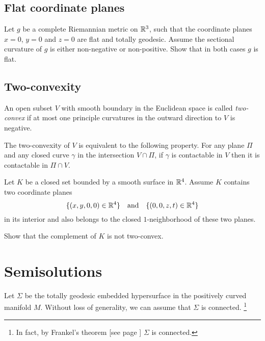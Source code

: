 \subsection*{Flat coordinate planes}
\label{Flat coordinate planes}

\begin{pr}
Let $g$ be a complete Riemannian metric on $\mathbb{R}^3$,
such that the coordinate planes $x=0$, $y=0$ and $z=0$ are flat and totally geodesic.
Assume the sectional curvature of $g$ is either non-negative or non-positive.
Show that in both cases $g$ is flat. 
\end{pr}

\subsection*{Two-convexity\many}
\label{Two-convexity}

An open subset $V$ with smooth boundary in the Euclidean space  
is called \emph{two-convex} if at most one principle curvatures in the outward direction to $V$ is negative.

The two-convexity of $V$ is equivalent to the following property.
For any plane $\Pi$ and any closed curve $\gamma$ in the intersection  $V\cap \Pi$,
if $\gamma$ is contactable in $V$ then it is contactable in $\Pi\cap V$.

\begin{pr}
Let $K$ be a closed set bounded by a smooth surface
in $\mathbb{R}^4$.
Assume $K$ contains two coordinate planes 
$$\{(x,y,0,0)\in\mathbb{R}^4\}
\quad
\text{and}
\quad
\{(0,0,z,t)\in\mathbb{R}^4\}$$
in its interior 
and also belongs to the closed $1$-neighborhood of these two planes.

Show that the complement of $K$ is not two-convex.
\end{pr}





\section*{Semisolutions}



Let $\Sigma$ be the totally geodesic embedded hypersurface in the positively curved manifold $M$.
Without loss of generality, we can assume that $\Sigma$ is connected.%
\footnote{In fact, by Frankel's theorem [see page \pageref{page:frankel}] $\Sigma$ is connected.}

